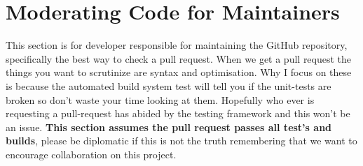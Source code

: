 \section{Moderating Code for Maintainers\label{sec:Maintaining}}

This section is for developer responsible for maintaining the GitHub repository, specifically the best way to check a pull request. When we get a pull request the things you want to scrutinize are syntax and optimisation. Why I focus on these is because the automated build system test will tell you if the unit-tests are broken so don't waste your time looking at them. Hopefully who ever is requesting a pull-request has abided by the testing framework and this won't be an issue. \textbf{This section assumes the pull request passes all test's and builds}, please be diplomatic if this is not the truth remembering that we want to encourage collaboration on this project.


